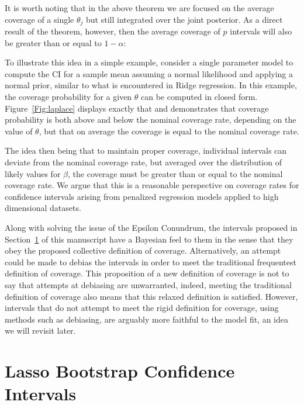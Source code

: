 It is worth noting that in the above theorem we are focused on the average coverage of a single $\theta_j$ but still integrated over the joint posterior. As a direct result of the theorem, however, then the average coverage of $p$ intervals will also be greater than or equal to $1-\alpha$:


To illustrate this idea in a simple example, consider a single parameter model to compute the CI for a sample mean assuming a normal likelihood and applying a normal prior, similar to what is encountered in Ridge regression. In this example, the coverage probability for a given $\theta$ can be computed in closed form. Figure~\ref{Fig:laplace} displays exactly that and demonstrates that coverage probability is both above and below the nominal coverage rate, depending on the value of $\theta$, but that on average the coverage is equal to the nominal coverage rate.

The idea then being that to maintain proper coverage, individual intervals can deviate from the nominal coverage rate, but averaged over the distribution of likely values for $\beta$, the coverage must be greater than or equal to the nominal coverage rate. We argue that this is a reasonable perspective on coverage rates for confidence intervals arising from penalized regression models applied to high dimensional datasets. 

Along with solving the issue of the Epsilon Conundrum, the intervals proposed in Section~\ref{Sec:methods} of this manuscript have a Bayesian feel to them in the sense that they obey the proposed collective definition of coverage. Alternatively, an attempt could be made to debias the intervals in order to meet the traditional frequentest definition of coverage. This proposition of a new definition of coverage is not to say that attempts at debiasing are unwarranted, indeed, meeting the traditional definition of coverage also means that this relaxed definition is satisfied. However, intervals that do not attempt to meet the rigid definition for coverage, using methods such as debiasing, are arguably more faithful to the model fit, an idea we will revisit later.


\section{Lasso Bootstrap Confidence Intervals}\label{Sec:methods}

